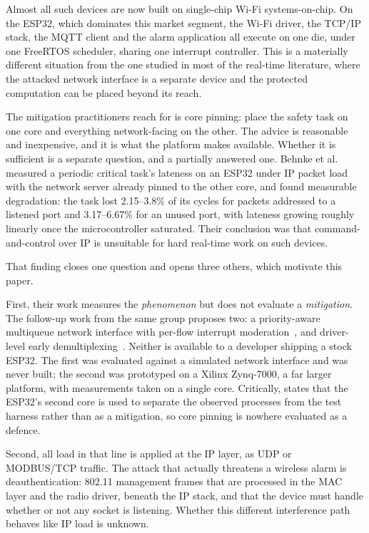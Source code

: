Almost all such devices are now built on single-chip Wi-Fi systems-on-chip. On the ESP32, which
dominates this market segment, the Wi-Fi driver, the TCP/IP stack, the MQTT client and the alarm
application all execute on one die, under one FreeRTOS scheduler, sharing one interrupt
controller. This is a materially different situation from the one studied in most of the
real-time literature, where the attacked network interface is a separate device and the protected
computation can be placed beyond its reach.

The mitigation practitioners reach for is core pinning: place the safety task on one core and
everything network-facing on the other. The advice is reasonable and inexpensive, and it is what
the platform makes available. Whether it is sufficient is a separate question, and a partially
answered one. Behnke et al.~\cite{behnke2020} measured a periodic critical task's lateness on an
ESP32 under IP packet load with the network server already pinned to the other core, and found
measurable degradation: the task lost 2.15--3.8\% of its cycles for packets addressed to a
listened port and 3.17--6.67\% for an unused port, with lateness growing roughly linearly once
the microcontroller saturated. Their conclusion was that command-and-control over IP is
unsuitable for hard real-time work on such devices.

That finding closes one question and opens three others, which motivate this paper.

First, their work measures the \emph{phenomenon} but does not evaluate a \emph{mitigation}. The
follow-up work from the same group proposes two: a priority-aware multiqueue network interface
with per-flow interrupt moderation~\cite{behnke2022}, and driver-level early
demultiplexing~\cite{behnke2023}. Neither is available to a developer shipping a stock ESP32. The
first was evaluated against a simulated network interface and was never built; the second was
prototyped on a Xilinx Zynq-7000, a far larger platform, with measurements taken on a single
core. Critically, \cite{behnke2023} states that the ESP32's second core is used to separate the
observed processes from the test harness rather than as a mitigation, so core pinning is nowhere
evaluated as a defence.

Second, all load in that line is applied at the IP layer, as UDP or MODBUS/TCP traffic. The
attack that actually threatens a wireless alarm is deauthentication: 802.11 management frames
that are processed in the MAC layer and the radio driver, beneath the IP stack, and that the
device must handle whether or not any socket is listening. Whether this different interference
path behaves like IP load is unknown.

